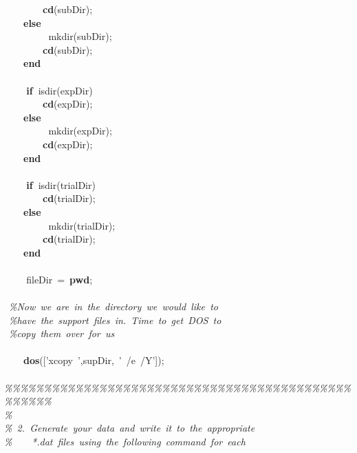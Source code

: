 \documentclass[singlecolumn,12pt]{article}
\newcommand{\hlstd}[1]{\textcolor[rgb]{0,0,0}{#1}}
\newcommand{\hlkey}[1]{\textcolor[rgb]{0,0,1}{\bf{#1}}}
\newcommand{\hlcom}[1]{\textcolor[rgb]{0.4,0.4,0.4}{\it{#1}}}
\begin{document}
{\hlstd{\ \ \ \ \ \ \ \ }}\hlkey{cd}\hlstd{(subDir);\\
\hlstd{\ \ \ \ }}\hlkey{else\\
\hlstd{\ \ \ \ \ \ \ \ }}\hlstd{mkdir(subDir);\\
\hlstd{\ \ \ \ \ \ \ \ }}\hlkey{cd}\hlstd{(subDir);\\
\hlstd{\ \ \ \ }}\hlkey{end\mbox{}\\
\\
\hlstd{\ \ \ \ }if\ }\hlstd{isdir(expDir)\\
\hlstd{\ \ \ \ \ \ \ \ }}\hlkey{cd}\hlstd{(expDir);\\
\hlstd{\ \ \ \ }}\hlkey{else\\
\hlstd{\ \ \ \ \ \ \ \ }}\hlstd{mkdir(expDir);\\
\hlstd{\ \ \ \ \ \ \ \ }}\hlkey{cd}\hlstd{(expDir);\\
\hlstd{\ \ \ \ }}\hlkey{end\mbox{}\\
\\
\hlstd{\ \ \ \ }if\ }\hlstd{isdir(trialDir)\\
\hlstd{\ \ \ \ \ \ \ \ }}\hlkey{cd}\hlstd{(trialDir);\\
\hlstd{\ \ \ \ }}\hlkey{else\\
\hlstd{\ \ \ \ \ \ \ \ }}\hlstd{mkdir(trialDir);\\
\hlstd{\ \ \ \ \ \ \ \ }}\hlkey{cd}\hlstd{(trialDir);\\
\hlstd{\ \ \ \ }}\hlkey{end\mbox{}\\
\\
\hlstd{\ \ \ \ }}\hlstd{fileDir\ =\ }\hlkey{pwd}\hlstd{;\mbox{}\\
\\
\ }\hlcom{\%Now\ we\ are\ in\ the\ directory\ we\ would\ like\ to\\
}\hlstd{\ }\hlcom{\%have\ the\ support\ files\ in.\ Time\ to\ get\ DOS\ to\\
}\hlstd{\ }\hlcom{\%copy\ them\ over\ for\ us\mbox{}\\
}\hlstd{\\
\hlstd{\ \ \ \ }}\hlkey{dos}\hlstd{(['xcopy\ ',supDir,\ '\ /e\ /Y']);\mbox{}\\
\\
}\hlcom{\%\%\%\%\%\%\%\%\%\%\%\%\%\%\%\%\%\%\%\%\%\%\%\%\%\%\%\%\%\%\%\%\%\%\%\%\%\%\%\%\%\%\%\%\%\%\%\%\%\%\\
}\hlstd{}\hlcom{\%\\
}\hlstd{}\hlcom{\%\ 2.\ Generate\ your\ data\ and\ write\ it\ to\ the\ appropriate\\
}\hlstd{}\hlcom{\%\hlstd{\ \ \ \ }*.dat\ files\ using\ the\ following\ command\ for\ each\\
}
\end{document}
